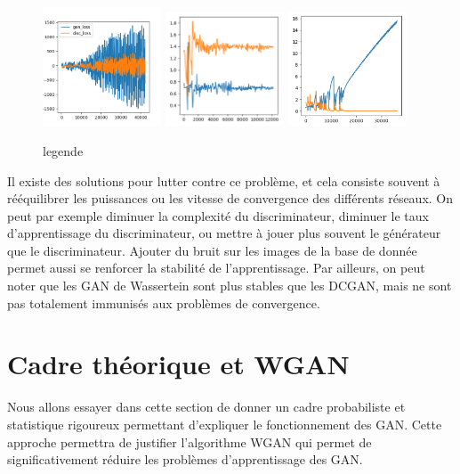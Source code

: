 \begin{figure}[!h]
\centering
\includegraphics[width=100pt]{"images/failure1"}
\includegraphics[width=100pt]{"images/failure2"}
\includegraphics[width=100pt]{"images/failure3"}
\caption{legende}
\end{figure}


Il existe des solutions pour lutter contre ce problème, et cela consiste souvent à rééquilibrer les puissances ou les vitesse de convergence des différents réseaux. On peut par exemple diminuer la complexité du discriminateur, diminuer le taux d'apprentissage du discriminateur, ou mettre à jouer plus souvent le générateur que le discriminateur.
Ajouter du bruit sur les images de la base de donnée permet aussi se renforcer la stabilité de l'apprentissage. Par ailleurs, on peut noter que les GAN de Wassertein sont plus stables que les DCGAN, mais ne sont pas totalement immunisés aux problèmes de convergence.

\section{Cadre théorique et WGAN}
Nous allons essayer dans cette section de donner un cadre probabiliste et statistique rigoureux permettant d'expliquer le fonctionnement des GAN. Cette approche permettra de justifier l'algorithme WGAN qui permet de significativement réduire les problèmes d'apprentissage des GAN.

